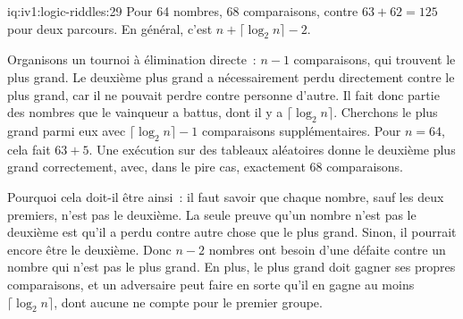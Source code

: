\begin{solution}{iq:iv1:logic-riddles:29}
Pour 64 nombres, 68 comparaisons, contre $63 + 62 = 125$ pour deux parcours. En général, c'est $n + \lceil \log_2 n \rceil - 2$.

Organisons un tournoi à élimination directe~: $n - 1$ comparaisons, qui trouvent le plus grand. Le deuxième plus grand a nécessairement perdu directement contre le plus grand, car il ne pouvait perdre contre personne d'autre. Il fait donc partie des nombres que le vainqueur a battus, dont il y a $\lceil \log_2 n \rceil$. Cherchons le plus grand parmi eux avec $\lceil \log_2 n \rceil - 1$ comparaisons supplémentaires. Pour $n = 64$, cela fait $63 + 5$. Une exécution sur des tableaux aléatoires donne le deuxième plus grand correctement, avec, dans le pire cas, exactement 68 comparaisons.

Pourquoi cela doit-il être ainsi~: il faut savoir que chaque nombre, sauf les deux premiers, n'est pas le deuxième. La seule preuve qu'un nombre n'est pas le deuxième est qu'il a perdu contre autre chose que le plus grand. Sinon, il pourrait encore être le deuxième. Donc $n - 2$ nombres ont besoin d'une défaite contre un nombre qui n'est pas le plus grand. En plus, le plus grand doit gagner ses propres comparaisons, et un adversaire peut faire en sorte qu'il en gagne au moins $\lceil \log_2 n \rceil$, dont aucune ne compte pour le premier groupe.

\end{solution}


